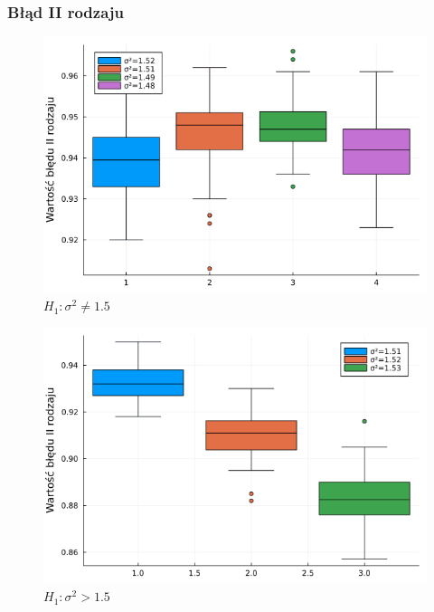 \documentclass{article}
\theoremstyle{break}
\begin{document}
\subsubsection*{Błąd II rodzaju}
\begin{figure}[H]
	\begin{center}
		\includegraphics[scale=0.5]{Z3.war1.png}
		\caption{$H_1: \sigma^2\ne1.5$}
	\end{center}
\end{figure}
\begin{figure}[H]
	\begin{center}
		\includegraphics[scale=0.5]{Z3.war2.png}
		\caption{$H_1: \sigma^2>1.5$}
	\end{center}
\end{figure}
\end{document}
